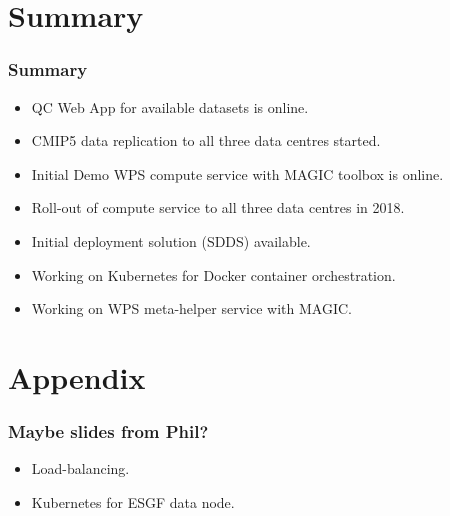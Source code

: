 \documentclass{beamer}
\begin{document}
\section{Summary}

\begin{frame}
\frametitle<presentation>{Summary}

  \begin{itemize}
    \item QC Web App for available datasets is online.
    \item CMIP5 data replication to all three data centres started.
    \item Initial Demo WPS compute service with MAGIC toolbox is online.
    \item Roll-out of compute service to all three data centres in 2018.
    \item Initial deployment solution (SDDS) available.
    \item Working on Kubernetes for Docker container orchestration.
    \item Working on WPS meta-helper service with MAGIC.
  \end{itemize}
\end{frame}

\appendix

\section{Appendix}

\begin{frame}
\frametitle<presentation>{Maybe slides from Phil?}

  \begin{itemize}
    \item Load-balancing.
    \item Kubernetes for ESGF data node.
  \end{itemize}
\end{frame}
\end{document}
